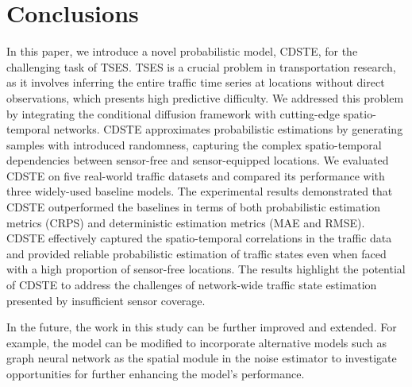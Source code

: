 \documentclass[a4paper,fleqn,12pt]{cas-sc}
\begin{document}
\section{Conclusions}\label{sec:conclusion}
In this paper, we introduce a novel probabilistic model, CDSTE, for the challenging task of TSES. TSES is a crucial problem in transportation research, as it involves inferring the entire traffic time series at locations without direct observations, which presents high predictive difficulty. We addressed this problem by integrating the conditional diffusion framework with cutting-edge spatio-temporal networks. CDSTE approximates probabilistic estimations by generating samples with introduced randomness, capturing the complex spatio-temporal dependencies between sensor-free and sensor-equipped locations. We evaluated CDSTE on five real-world traffic datasets and compared its performance with three widely-used baseline models. The experimental results demonstrated that CDSTE outperformed the baselines in terms of both probabilistic estimation metrics (CRPS) and deterministic estimation metrics (MAE and RMSE). CDSTE effectively captured the spatio-temporal correlations in the traffic data and provided reliable probabilistic estimation of traffic states even when faced with a high proportion of sensor-free locations. The results highlight the potential of CDSTE to address the challenges of network-wide traffic state estimation presented by insufficient sensor coverage.

In the future, the work in this study can be further improved and extended. For example, the model can be modified to incorporate alternative models such as graph neural network as the spatial module in the noise estimator to investigate opportunities for further enhancing the model's performance.


%
\nolinenumbers



\end{document}
